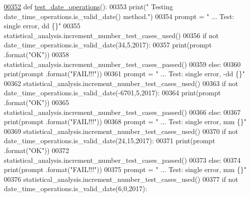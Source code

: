 \begin{DoxyCode}
\hypertarget{classutilities_1_1date__time__processing__tester_1_1date__time__operations__tester_l00352}{}\hyperlink{classutilities_1_1date__time__processing__tester_1_1date__time__operations__tester_a02e06fd6efcdf83ecedfe2b06eb6c965}{00352}     \textcolor{keyword}{def }\hyperlink{classutilities_1_1date__time__processing__tester_1_1date__time__operations__tester_a02e06fd6efcdf83ecedfe2b06eb6c965}{test\_date\_operations}():
00353         print(\textcolor{stringliteral}{" Testing date\_time\_operations.is\_valid\_date() method."})
00354         prompt = \textcolor{stringliteral}{"  ... Test: single error, dd              \{\}"}
00355         statistical\_analysis.increment\_number\_test\_cases\_used()
00356         \textcolor{keywordflow}{if} \textcolor{keywordflow}{not} date\_time\_operations.is\_valid\_date(34,5,2017):
00357             print(prompt .format(\textcolor{stringliteral}{"OK"}))
00358             statistical\_analysis.increment\_number\_test\_cases\_passed()
00359         \textcolor{keywordflow}{else}:
00360             print(prompt .format(\textcolor{stringliteral}{"FAIL!!!"}))
00361         prompt = \textcolor{stringliteral}{"  ... Test: single error, -dd             \{\}"}
00362         statistical\_analysis.increment\_number\_test\_cases\_used()
00363         \textcolor{keywordflow}{if} \textcolor{keywordflow}{not} date\_time\_operations.is\_valid\_date(-6701,5,2017):
00364             print(prompt .format(\textcolor{stringliteral}{"OK"}))
00365             statistical\_analysis.increment\_number\_test\_cases\_passed()
00366         \textcolor{keywordflow}{else}:
00367             print(prompt .format(\textcolor{stringliteral}{"FAIL!!!"}))
00368         prompt = \textcolor{stringliteral}{"  ... Test: single error, mm              \{\}"}
00369         statistical\_analysis.increment\_number\_test\_cases\_used()
00370         \textcolor{keywordflow}{if} \textcolor{keywordflow}{not} date\_time\_operations.is\_valid\_date(24,15,2017):
00371             print(prompt .format(\textcolor{stringliteral}{"OK"}))
00372             statistical\_analysis.increment\_number\_test\_cases\_passed()
00373         \textcolor{keywordflow}{else}:
00374             print(prompt .format(\textcolor{stringliteral}{"FAIL!!!"}))
00375         prompt = \textcolor{stringliteral}{"  ... Test: single error, mm              \{\}"}
00376         statistical\_analysis.increment\_number\_test\_cases\_used()
00377         \textcolor{keywordflow}{if} \textcolor{keywordflow}{not} date\_time\_operations.is\_valid\_date(6,0,2017):

\end{DoxyCode}
